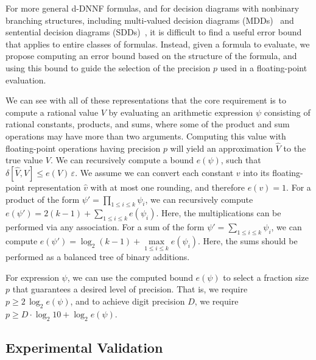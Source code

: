 \documentclass[letterpaper,USenglish,cleveref, autoref, thm-restate]{lipics-v2021}
\newcommand{\approximate}[1]{\hat{#1}}
\newcommand{\approxv}{\approximate{v}}
\newcommand{\approxV}{\approximate{V}}
\newcommand{\aerror}{\delta}
\newcommand{\roundepsilon}{\varepsilon}
\begin{document}
For more general d-DNNF formulas, and for decision diagrams with
nonbinary branching structures, including multi-valued decision
diagrams (MDDs)~\cite{srinivasan:iccad:1990} and sentential decision
diagrams (SDDs)~\cite{darwiche:ijcai:2011}, it is difficult to find a
useful error bound that applies to entire classes of formulas.
Instead, given a formula to evaluate,
we propose computing an error bound based on the
structure of the formula, and using this bound to guide the selection of
the precision $p$ used in a floating-point evaluation.

We can see with all of these representations that the core requirement
is to compute a rational value $V$ by evaluating an arithmetic
expression $\psi$ consisting of rational constants, products, and
sums, where some of the product and sum operations may have more than
two arguments.  Computing this value with floating-point operations
having precision $p$ will yield an approximation $\approxV$ to the
true value $V$.  We can recursively compute a bound $e(\psi)$, such that
$\aerror[\approxV, V] \leq e(V) \,\roundepsilon$.  We assume we
can convert each constant $v$ into its floating-point representation
$\approxv$ with at most one rounding, and therefore $e(v) = 1$.  For a
product of the form $\psi' = \prod_{1 \leq i \leq k} \psi_i$, we can
recursively compute $e(\psi') = 2(k-1) + \sum_{1 \leq i \leq k}
e(\psi_i)$.  Here, the multiplications can be performed via any
association.
For a sum of the form
$\psi' = \sum_{1 \leq i \leq k} \psi_i$, we can compute
$e(\psi') = \log_2(k-1) + \max\limits_{1\leq i \leq k} e(\psi_i)$.  Here, the sums should be performed as a balanced tree of binary additions.

For expression $\psi$, we can use the computed bound $e(\psi)$ to
select a fraction size $p$ that guarantees a desired level of
precision.  That is, we require $p \geq 2\,\log_2 e(\psi)$, and to
achieve digit precision $D$, we require $p \geq D \cdot \log_2 10 +\log_2 e(\psi)$.

\subsection{Experimental Validation}
\end{document}
